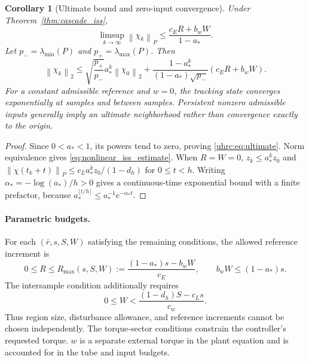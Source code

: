\documentclass[12pt, a4paper]{article}
\newtheorem{corollary}{Corollary}
\begin{document}
\begin{corollary}[Ultimate bound and zero-input convergence]
\label{uhrc:cor:ultimate}
Under Theorem~\ref{thm:cascade_iss},
\begin{equation}
 \limsup_{k\to\infty}\left\lVert \chi_k\right\rVert_{P}
 \le\frac{c_ER+b_wW}{1-a_*}.
 \label{uhrc:eq:ultimate}
\end{equation}
Let $p_-=\lambda_{\min}(P)$ and $p_+=\lambda_{\max}(P)$. Then
\begin{equation}
 \left\lVert \chi_k\right\rVert_{2}
 \le\sqrt{\frac{p_+}{p_-}}a_*^k\left\lVert \chi_0\right\rVert_{2}
 +\frac{1-a_*^k}{(1-a_*)\sqrt{p_-}}(c_ER+b_wW).
 \label{eq:nonlinear_iss_estimate}
\end{equation}
For a constant admissible reference and $w=0$, the tracking state converges
exponentially at samples and between samples. Persistent nonzero admissible
inputs generally imply an ultimate neighborhood rather than convergence
exactly to the origin.
\end{corollary}
\begin{proof}
Since $0<a_*<1$, its powers tend to zero, proving
\eqref{uhrc:eq:ultimate}. Norm equivalence gives
\eqref{eq:nonlinear_iss_estimate}. When $R=W=0$,
$z_k\le a_*^kz_0$ and
$\left\lVert \chi(t_k+t)\right\rVert_{P}\le c_La_*^kz_0/(1-d_h)$ for $0\le t<h$.
Writing $\alpha_*=-\log(a_*)/h>0$ gives a continuous-time exponential
bound with a finite prefactor, because
$a_*^{\lfloor t/h\rfloor}\le a_*^{-1}e^{-\alpha_*t}$.
\end{proof}
\paragraph{Parametric budgets.}
For each $(\bar r,s,S,W)$ satisfying the remaining conditions, the allowed
reference increment is
\begin{equation}
 0\le R\le R_{\max}(s,S,W)
 :=\frac{(1-a_*)s-b_wW}{c_E},\qquad
 b_wW\le(1-a_*)s.
 \label{eq:parametric_reference_budget}
\end{equation}
The intersample condition additionally requires
\begin{equation}
 0\le W<\frac{(1-d_h)S-c_Ls}{c_w}.
 \label{eq:parametric_disturbance_budget}
\end{equation}
Thus region size, disturbance allowance, and reference increments cannot
be chosen independently. The torque-sector conditions constrain the
controller's requested torque. $w$ is a separate external torque in the
plant equation and is accounted for in the tube and input budgets.
\end{document}
